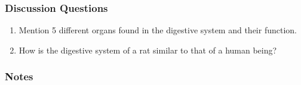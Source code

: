 \subsubsection*{Discussion Questions}
\begin{enumerate}
\item{Mention 5 different organs found in the digestive system and their function.}
\item{How is the digestive system of a rat similar to that of a human being?}
\end{enumerate}

\subsubsection*{Notes}
